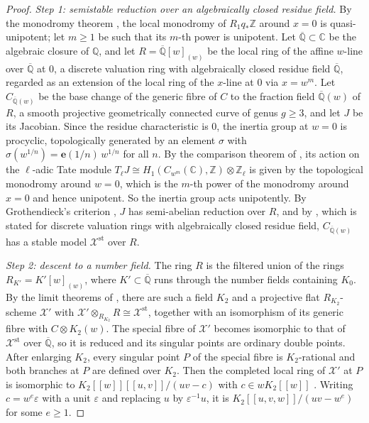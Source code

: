 \documentclass[11pt]{amsart}
\theoremstyle{definition}
\theoremstyle{remark}
\numberwithin{equation}{section}
\newcommand{\Q}{\mathbb{Q}}
\newcommand{\Z}{\mathbb{Z}}
\newcommand{\C}{\mathbb{C}}
\newcommand{\Qb}{\overline{\mathbb{Q}}}
\newcommand{\e}{\mathbf{e}}
\newcommand{\cX}{\mathcal{X}}
\begin{document}
\begin{proof}
\emph{Step 1: semistable reduction over an algebraically closed residue field.} By the monodromy theorem \citep{Katz1970}, the local monodromy of $R_1q_*\Z$ around $x=0$ is quasi-unipotent; let $m\ge1$ be such that its $m$-th power is unipotent. Let $\Qb\subset\C$ be the algebraic closure of $\Q$, and let $R=\Qb[w]_{(w)}$ be the local ring of the affine $w$-line over $\Qb$ at $0$, a discrete valuation ring with algebraically closed residue field $\Qb$, regarded as an extension of the local ring of the $x$-line at $0$ via $x=w^m$. Let $C_{\Qb(w)}$ be the base change of the generic fibre of $C$ to the fraction field $\Qb(w)$ of $R$, a smooth projective geometrically connected curve of genus $g\ge3$, and let $J$ be its Jacobian. Since the residue characteristic is $0$, the inertia group at $w=0$ is procyclic, topologically generated by an element $\sigma$ with $\sigma(w^{1/n})=\e(1/n)\,w^{1/n}$ for all $n$. By the comparison theorem of \citet[Exp.~XIV]{DeligneKatz1973}, its action on the $\ell$-adic Tate module $T_\ell J\cong H_1(C_{w^m}(\C),\Z)\otimes\Z_\ell$ is given by the topological monodromy around $w=0$, which is the $m$-th power of the monodromy around $x=0$ and hence unipotent. So the inertia group acts unipotently. By Grothendieck's criterion \citep[Exp.~IX, \S3]{SGA7I}, $J$ has semi-abelian reduction over $R$, and by \citet[Theorem~2.4]{DeligneMumford1969}, which is stated for discrete valuation rings with algebraically closed residue field, $C_{\Qb(w)}$ has a stable model $\cX^{\mathrm{st}}$ over $R$.

\emph{Step 2: descent to a number field.} The ring $R$ is the filtered union of the rings $R_{K'}=K'[w]_{(w)}$, where $K'\subset\Qb$ runs through the number fields containing $K_0$. By the limit theorems of \citet[\S8]{EGAIV3}, there are such a field $K_2$ and a projective flat $R_{K_2}$-scheme $\cX'$ with $\cX'\otimes_{R_{K_2}}R\cong\cX^{\mathrm{st}}$, together with an isomorphism of its generic fibre with $C\otimes K_2(w)$. The special fibre of $\cX'$ becomes isomorphic to that of $\cX^{\mathrm{st}}$ over $\Qb$, so it is reduced and its singular points are ordinary double points. After enlarging $K_2$, every singular point $P$ of the special fibre is $K_2$-rational and both branches at $P$ are defined over $K_2$. Then the completed local ring of $\cX'$ at $P$ is isomorphic to $K_2[[w]][[u,v]]/(uv-c)$ with $c\in wK_2[[w]]$ \citep[\S10.3]{Liu2002}. Writing $c=w^e\varepsilon$ with a unit $\varepsilon$ and replacing $u$ by $\varepsilon^{-1}u$, it is $K_2[[u,v,w]]/(uv-w^e)$ for some $e\ge1$.


\end{proof}
\end{document}
